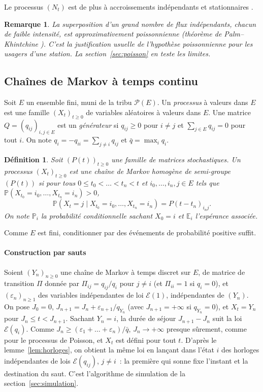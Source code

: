 \documentclass[10pt,a4paper,twocolumn]{article}
\theoremstyle{enonce}
\theoremstyle{defi}
\newtheorem{definition}[theoreme]{Définition}
\newtheorem{remarque}[theoreme]{Remarque}
\newcommand{\PP}{\mathbb{P}}
\newcommand{\EE}{\mathbb{E}}
\begin{document}
Le processus $(N_t)$ est de plus à accroissements indépendants et stationnaires \cite[§2.4]{Nor97}.

\begin{remarque}\label{rem:palm}
La superposition d'un grand nombre de flux indépendants, chacun de faible intensité, est approximativement poissonnienne (théorème de Palm--Khintchine \cite{DVJ03}). C'est la justification usuelle de l'hypothèse poissonnienne pour les usagers d'une station. La section~\ref{sec:poisson} en teste les limites.
\end{remarque}

\subsection{Chaînes de Markov à temps continu}

Soit $E$ un ensemble fini, muni de la tribu $\mathcal{P}(E)$. Un \emph{processus} à valeurs dans $E$ est une famille $(X_t)_{t\geq0}$ de variables aléatoires à valeurs dans $E$. Une matrice $Q=(q_{ij})_{i,j\in E}$ est un \emph{générateur} si $q_{ij}\geq0$ pour $i\neq j$ et $\sum_{j\in E}q_{ij}=0$ pour tout $i$. On note $q_i=-q_{ii}=\sum_{j\neq i}q_{ij}$ et $\bar q=\max_iq_i$.

\begin{definition}
Soit $(P(t))_{t\geq0}$ une famille de matrices stochastiques. Un processus $(X_t)_{t\geq0}$ est une \emph{chaîne de Markov homogène} de semi-groupe $(P(t))$ si pour tous $0\leq t_0<\dots<t_n<t$ et $i_0,\dots,i_n,j\in E$ tels que $\PP(X_{t_0}=i_0,\dots,X_{t_n}=i_n)>0$,
\[
\PP(X_t=j\mid X_{t_0}=i_0,\dots,X_{t_n}=i_n)=P(t-t_n)_{i_nj}.
\]
On note $\PP_i$ la probabilité conditionnelle sachant $X_0=i$ et $\EE_i$ l'espérance associée.
\end{definition}

Comme $E$ est fini, conditionner par des événements de probabilité positive suffit.

\paragraph{Construction par sauts} Soient $(Y_n)_{n\geq0}$ une chaîne de Markov à temps discret sur $E$, de matrice de transition $\Pi$ donnée par $\Pi_{ij}=q_{ij}/q_i$ pour $j\neq i$ (et $\Pi_{ii}=1$ si $q_i=0$), et $(\varepsilon_n)_{n\geq1}$ des variables indépendantes de loi $\mathcal{E}(1)$, indépendantes de $(Y_n)$. On pose $J_0=0$, $J_{n+1}=J_n+\varepsilon_{n+1}/q_{Y_n}$ (avec $J_{n+1}=+\infty$ si $q_{Y_n}=0$), et $X_t=Y_n$ pour $J_n\leq t<J_{n+1}$. Sachant $Y_n=i$, la durée de séjour $J_{n+1}-J_n$ suit la loi $\mathcal{E}(q_i)$. Comme $J_n\geq(\varepsilon_1+\dots+\varepsilon_n)/\bar q$, $J_n\to+\infty$ presque sûrement, comme pour le processus de Poisson, et $X_t$ est défini pour tout $t$. D'après le lemme~\ref{lem:horloges}, on obtient la même loi en lançant dans l'état $i$ des horloges indépendantes de lois $\mathcal{E}(q_{ij})$, $j\neq i$~: la première qui sonne fixe l'instant et la destination du saut. C'est l'algorithme de simulation de la section~\ref{sec:simulation}.
\end{document}
